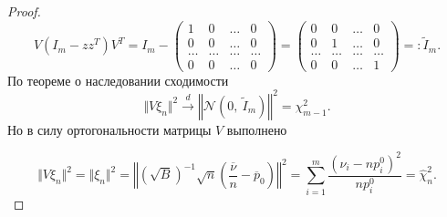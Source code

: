 \begin{proof}
\begin{equation*}
    V\left( I_{m} -zz^{T}\right) V^{T} =I_{m} -\begin{pmatrix}
    1 & 0 & \dotsc  & 0\\
    0 & 0 & \dotsc  & 0\\
    \dotsc  & \dotsc  & \dotsc  & \dotsc \\
    0 & 0 & \dotsc  & 0
    \end{pmatrix} =\begin{pmatrix}
    0 & 0 & \dotsc  & 0\\
    0 & 1 & \dotsc  & 0\\
    \dotsc  & \dotsc  & \dotsc  & \dotsc \\
    0 & 0 & \dotsc  & 1
    \end{pmatrix} =:\tilde{I}_{m} .
    \end{equation*}
    По теореме о наследовании сходимости
    \begin{equation*}
        \Vert V\xi _{n}\Vert ^{2}\xrightarrow{d}\left\Vert \mathcal{N}\left( 0,\ \tilde{I}_{m}\right)\right\Vert ^{2} =\chi _{m-1}^{2} .
    \end{equation*}
    Но в силу ортогональности матрицы $\displaystyle V$ выполнено
    
    
    \begin{equation*}
        \Vert V\xi _{n}\Vert ^{2} =\Vert \xi _{n}\Vert ^{2} =\left\Vert \left(\sqrt{B}\right)^{-1}\sqrt{n}\left(\dfrac{\overline{\nu }}{n} -\overline{p}_{0}\right)\right\Vert ^{2} =\sum _{i=1}^{m}\dfrac{\left( \nu _{i} -np_{i}^{0}\right)^{2}}{np_{i}^{0}} =\hat{\chi }_{n}^{2} .
    \end{equation*}
\end{proof}